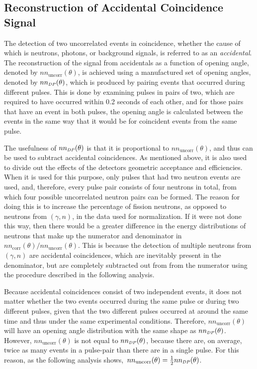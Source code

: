 \subsection{Reconstruction of Accidental Coincidence Signal}
\label{Reconstruction of Accidental Coincidence}
The detection of two uncorrelated events in coincidence, whether the cause of which is neutrons, photons, or background signals, is referred to as an \emph{accidental}.
The reconstruction of the signal from accidentals as a function of opening angle, denoted by $nn_{\text{uncorr}}(\theta)$, is achieved using a manufactured set of opening angles, denoted by $nn_{\scaleto{DP}{4pt}}(\theta)$, which is produced by pairing events that occurred during different pulses.
This is done by examining pulses in pairs of two, which are required to have occurred within 0.2 seconds of each other, and for those pairs that have an event in both pulses, the opening angle is calculated between the events in the same way that it would be for coincident events from the same pulse.


The usefulness of $nn_{\scaleto{DP}{4pt}}(\theta)$ is that it is proportional to $nn_{\text{uncorr}}(\theta)$, and thus can be used to subtract accidental coincidences.
As mentioned above, it is also used to divide out the effects of the detectors geometric acceptance and efficiencies.
When it is used for this purpose, only pulses that had two neutron events are used, and, therefore, every pulse pair consists of four neutrons in total, from which four possible uncorrelated neutron pairs can be formed.
The reason for doing this is to increase the percentage of fission neutrons, as opposed to neutrons from $(\gamma,n)$, in the data used for normalization.
If it were not done this way, then there would be a greater difference in the energy distributions of neutrons that make up the numerator and denominator in $nn_{\text{corr}}(\theta)/nn_{\text{uncorr}}(\theta)$.
This is because the detection of multiple neutrons from $(\gamma,n)$ are accidental coincidences, which are inevitably present in the denominator, but are completely subtracted out from from the numerator using the procedure described in the following analysis.

Because accidental coincidences consist of two independent events, it does not matter whether the two events occurred during the same pulse or during two different pulses, given that the two different pulses occurred at around the same time and thus under the same experimental conditions.
Therefore, $nn_{\text{uncorr}}(\theta)$ will have an opening angle distribution with the same shape as  $nn_{\scaleto{DP}{4pt}}(\theta)$.
However, $nn_{\text{uncorr}}(\theta)$ is not equal to $nn_{\scaleto{DP}{4pt}}(\theta)$, because there are, on average, twice as many events in a pulse-pair than there are in a single pulse.
For this reason, as the following analysis shows,~$nn_{\text{uncorr}}(\theta) = \frac{1}{2}nn_{\scaleto{DP}{4pt}}(\theta)$.


